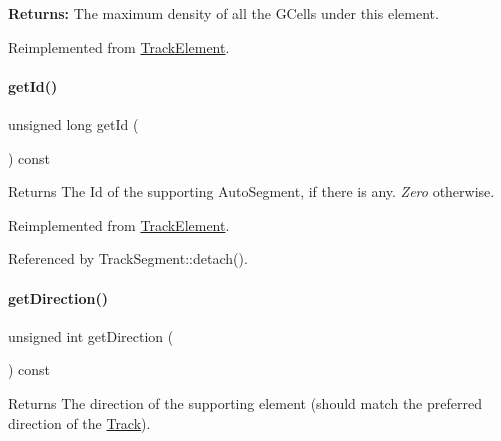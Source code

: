 {\bfseries Returns\+:} The maximum density of all the G\+Cells under this element. 

Reimplemented from \mbox{\hyperlink{classKite_1_1TrackElement_aa34ceb4288e76357b65725ca00e56df8}{Track\+Element}}.

\mbox{\label{classKite_1_1TrackSegment_afdedcef127ad2a3677a5b48d7d3453f3}} 
\paragraph{\texorpdfstring{get\+Id()}{getId()}}
{\footnotesize\ttfamily unsigned long get\+Id (\begin{DoxyParamCaption}{ }\end{DoxyParamCaption}) const\hspace{0.3cm}{\ttfamily [virtual]}}

\begin{DoxyReturn}{Returns}
The {\ttfamily Id} of the supporting Auto\+Segment, if there is any. {\itshape Zero} otherwise. 
\end{DoxyReturn}


Reimplemented from \mbox{\hyperlink{classKite_1_1TrackElement_afdedcef127ad2a3677a5b48d7d3453f3}{Track\+Element}}.



Referenced by Track\+Segment\+::detach().

\mbox{\label{classKite_1_1TrackSegment_a0dd7cf705ace42c662c289955313b2e9}} 
\paragraph{\texorpdfstring{get\+Direction()}{getDirection()}}
{\footnotesize\ttfamily unsigned int get\+Direction (\begin{DoxyParamCaption}{ }\end{DoxyParamCaption}) const\hspace{0.3cm}{\ttfamily [virtual]}}

\begin{DoxyReturn}{Returns}
The direction of the supporting element (should match the preferred direction of the \mbox{\hyperlink{classKite_1_1Track}{Track}}). 
\end{DoxyReturn}


